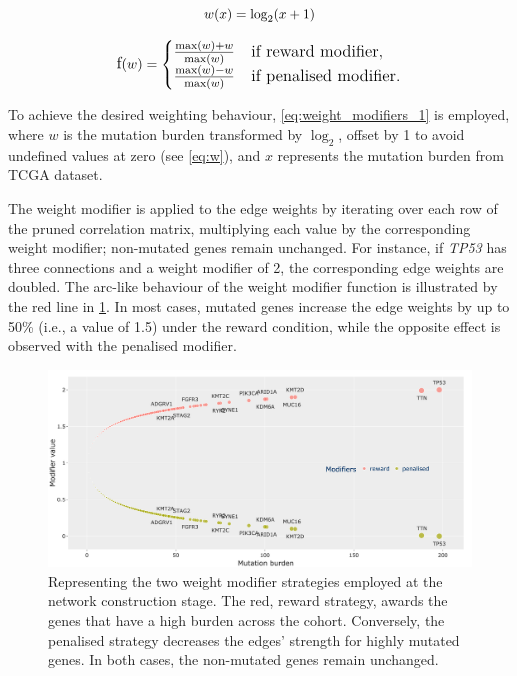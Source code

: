\begin{equation} \label{eq:w}
    \large{
    w(x) = \log_2(x+1)
    }
\end{equation}

\begin{equation} \label{eq:weight_modifiers_1}
    \large{
    \text{f}(w) = 
    \begin{cases} 
    \frac{\max(w) + w}{\max(w)} & \text{if reward modifier}, \\
    \frac{\max(w) - w}{\max(w)} & \text{if penalised modifier}.
    \end{cases}
    }
\end{equation}

To achieve the desired weighting behaviour, \cref{eq:weight_modifiers_1} is employed, where $w$ is the mutation burden transformed by $\log_2$, offset by 1 to avoid undefined values at zero (see \cref{eq:w}), and $x$ represents the mutation burden from TCGA dataset.

The weight modifier is applied to the edge weights by iterating over each row of the pruned correlation matrix, multiplying each value by the corresponding weight modifier; non-mutated genes remain unchanged. For instance, if \textit{TP53} has three connections and a weight modifier of 2, the corresponding edge weights are doubled. The arc-like behaviour of the weight modifier function is illustrated by the red line in \cref{fig:N_I:modifiers}. In most cases, mutated genes increase the edge weights by up to 50\% (i.e., a value of 1.5) under the reward condition, while the opposite effect is observed with the penalised modifier.



\begin{figure}[!htb]    
    \centering
    \includegraphics[width=1.0\textwidth,keepaspectratio]{Sections/Network_I/Resources/Methods/modifiers.png}
    \caption[Reward v1 vs Penalised edge weight modifiers]{Representing the two weight modifier strategies employed at the network construction stage. The red, reward strategy, awards the genes that have a high burden across the cohort. Conversely, the  penalised strategy decreases the edges' strength for highly mutated genes. In both cases, the non-mutated genes remain unchanged.}
    \label{fig:N_I:modifiers}
\end{figure}

